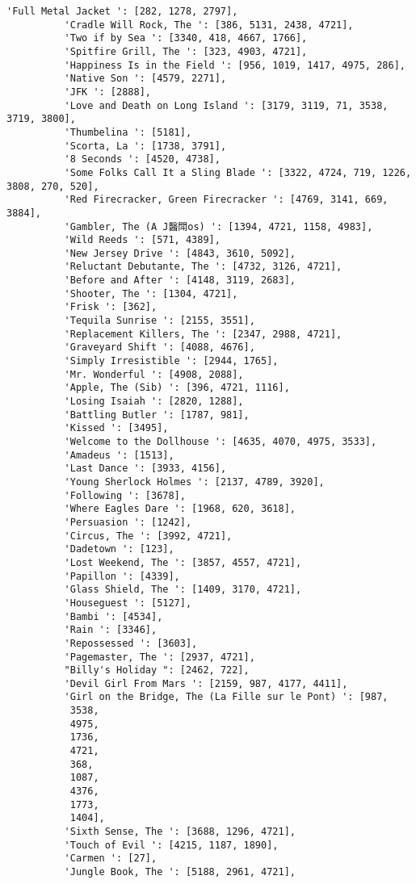\documentclass[11pt]{article}
\begin{document}
\begin{Verbatim}[commandchars=\\\{\}]
          'Full Metal Jacket ': [282, 1278, 2797],
          'Cradle Will Rock, The ': [386, 5131, 2438, 4721],
          'Two if by Sea ': [3340, 418, 4667, 1766],
          'Spitfire Grill, The ': [323, 4903, 4721],
          'Happiness Is in the Field ': [956, 1019, 1417, 4975, 286],
          'Native Son ': [4579, 2271],
          'JFK ': [2888],
          'Love and Death on Long Island ': [3179, 3119, 71, 3538, 3719, 3800],
          'Thumbelina ': [5181],
          'Scorta, La ': [1738, 3791],
          '8 Seconds ': [4520, 4738],
          'Some Folks Call It a Sling Blade ': [3322, 4724, 719, 1226, 3808, 270, 520],
          'Red Firecracker, Green Firecracker ': [4769, 3141, 669, 3884],
          'Gambler, The (A J醫閗os) ': [1394, 4721, 1158, 4983],
          'Wild Reeds ': [571, 4389],
          'New Jersey Drive ': [4843, 3610, 5092],
          'Reluctant Debutante, The ': [4732, 3126, 4721],
          'Before and After ': [4148, 3119, 2683],
          'Shooter, The ': [1304, 4721],
          'Frisk ': [362],
          'Tequila Sunrise ': [2155, 3551],
          'Replacement Killers, The ': [2347, 2988, 4721],
          'Graveyard Shift ': [4088, 4676],
          'Simply Irresistible ': [2944, 1765],
          'Mr. Wonderful ': [4908, 2088],
          'Apple, The (Sib) ': [396, 4721, 1116],
          'Losing Isaiah ': [2820, 1288],
          'Battling Butler ': [1787, 981],
          'Kissed ': [3495],
          'Welcome to the Dollhouse ': [4635, 4070, 4975, 3533],
          'Amadeus ': [1513],
          'Last Dance ': [3933, 4156],
          'Young Sherlock Holmes ': [2137, 4789, 3920],
          'Following ': [3678],
          'Where Eagles Dare ': [1968, 620, 3618],
          'Persuasion ': [1242],
          'Circus, The ': [3992, 4721],
          'Dadetown ': [123],
          'Lost Weekend, The ': [3857, 4557, 4721],
          'Papillon ': [4339],
          'Glass Shield, The ': [1409, 3170, 4721],
          'Houseguest ': [5127],
          'Bambi ': [4534],
          'Rain ': [3346],
          'Repossessed ': [3603],
          'Pagemaster, The ': [2937, 4721],
          "Billy's Holiday ": [2462, 722],
          'Devil Girl From Mars ': [2159, 987, 4177, 4411],
          'Girl on the Bridge, The (La Fille sur le Pont) ': [987,
           3538,
           4975,
           1736,
           4721,
           368,
           1087,
           4376,
           1773,
           1404],
          'Sixth Sense, The ': [3688, 1296, 4721],
          'Touch of Evil ': [4215, 1187, 1890],
          'Carmen ': [27],
          'Jungle Book, The ': [5188, 2961, 4721],

\end{Verbatim}
\end{document}
